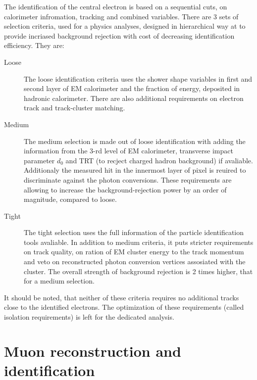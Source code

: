 The identification of the central electron is based on a sequential cuts,  on calorimeter infromation, tracking and combined variables. There are 3 sets of selection criteria, used for a physics analyses, designed in hierarchical way at to provide incriased background rejection with cost of decreasing identification efficiency. They are:
\begin{description}
\item[Loose] The loose identification criteria  uses the shower shape variables in first and second layer of EM calorimeter and the fraction of energy, deposited in hadronic calorimeter. There are also additional requirements on electron track and track-cluster matching.
\item [Medium] The medium selection is made out of loose identification with adding the information from the 3-rd level of EM calorimeter, transverse impact parameter $d_0$ and TRT (to recject charged hadron background) if avaliable. Additionaly the measured hit in the innermost layer of pixel is reuired to discriminate against the photon conversions. These requirements are allowing to increase the background-rejection power by an order of magnitude, compared to loose.
\item [Tight] The tight selection uses the full information of the particle identification tools avaliable. In addition to medium criteria, it puts stricter requirements on track quality, on ration of EM cluster energy to the track momentum and veto on reconstructed photon conversion vertices assosiated with the cluster. The overall strength of background rejection is 2 times higher, that for a medium selection.
\end{description}

It should be noted, that neither of these criteria requires no additional tracks close to the identified electrons. The optimization of these requirements (called isolation requirements) is left for the dedicated analysis. 

\section{Muon reconstruction and identification}\label{sec:MuonRec}

